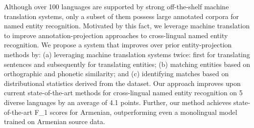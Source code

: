 Although over 100 languages are supported by strong off-the-shelf machine translation systems, only a subset of them possess large annotated corpora for named entity recognition. Motivated by this fact, we leverage machine translation to improve annotation-projection approaches to cross-lingual named entity recognition. We propose a system that improves over prior entity-projection methods by: (a) leveraging machine translation systems twice: first for translating sentences and subsequently for translating entities; (b) matching entities based on orthographic and phonetic similarity; and (c) identifying matches based on distributional statistics derived from the dataset. Our approach improves upon current state-of-the-art methods for cross-lingual named entity recognition on 5 diverse languages by an average of 4.1 points. Further, our method achieves state-of-the-art F\_1 scores for Armenian, outperforming even a monolingual model trained on Armenian source data.
